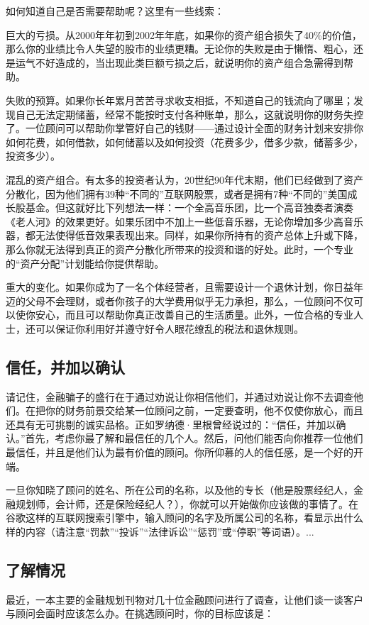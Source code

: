 \documentclass[12pt,oneside]{book}
\begin{document}
如何知道自己是否需要帮助呢？这里有一些线索：

巨大的亏损。从2000年年初到2002年年底，如果你的资产组合损失了40\%的价值，那么你的业绩比令人失望的股市的业绩更糟。无论你的失败是由于懒惰、粗心，还是运气不好造成的，当出现此类巨额亏损之后，就说明你的资产组合急需得到帮助。

失败的预算。如果你长年累月苦苦寻求收支相抵，不知道自己的钱流向了哪里；发现自己无法定期储蓄，经常不能按时支付各种账单，那么，这就说明你的财务失控了。一位顾问可以帮助你掌管好自己的钱财——通过设计全面的财务计划来安排你如何花费，如何借款，如何储蓄以及如何投资（花费多少，借多少款，储蓄多少，投资多少）。

混乱的资产组合。有太多的投资者认为，20世纪90年代末期，他们已经做到了资产分散化，因为他们拥有39种“不同的”互联网股票，或者是拥有7种“不同的”美国成长股基金。但这就好比下列想法一样：一个全高音乐团，比一个高音独奏者演奏《老人河》的效果更好。如果乐团中不加上一些低音乐器，无论你增加多少高音乐器，都无法使得低音效果表现出来。同样，如果你所持有的资产总体上升或下降，那么你就无法得到真正的资产分散化所带来的投资和谐的好处。此时，一个专业的“资产分配”计划能给你提供帮助。

重大的变化。如果你成为了一名个体经营者，且需要设计一个退休计划，你日益年迈的父母不会理财，或者你孩子的大学费用似乎无力承担，那么，一位顾问不仅可以使你安心，而且可以帮助你真正改善自己的生活质量。此外，一位合格的专业人士，还可以保证你利用好并遵守好令人眼花缭乱的税法和退休规则。

\subsection{信任，并加以确认}
请记住，金融骗子的盛行在于通过劝说让你相信他们，并通过劝说让你不去调查他们。在把你的财务前景交给某一位顾问之前，一定要查明，他不仅使你放心，而且还具有无可挑剔的诚实品格。正如罗纳德·里根曾经说过的：“信任，并加以确认。”首先，考虑你最了解和最信任的几个人。然后，问他们能否向你推荐一位他们最信任，并且是他们认为最有价值的顾问。你所仰慕的人的信任感，是一个好的开端。

一旦你知晓了顾问的姓名、所在公司的名称，以及他的专长（他是股票经纪人，金融规划师，会计师，还是保险经纪人？），你就可以开始做你应该做的事情了。在谷歌这样的互联网搜索引擎中，输入顾问的名字及所属公司的名称，看显示出什么样的内容（请注意“罚款”“投诉”“法律诉讼”“惩罚”或“停职”等词语）。...


\subsection{了解情况}
最近，一本主要的金融规划刊物对几十位金融顾问进行了调查，让他们谈一谈客户与顾问会面时应该怎么办。在挑选顾问时，你的目标应该是：
\end{document}
